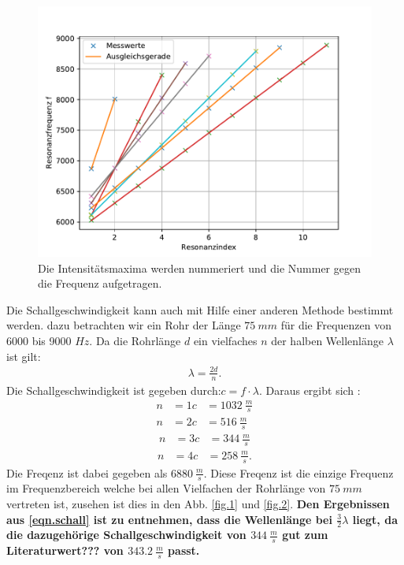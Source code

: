 \begin{figure}[h!]
  \centering
  \includegraphics[width=\textwidth]{linearfit.pdf}
  \caption{Die Intensitätsmaxima werden nummeriert und die Nummer gegen die Frequenz aufgetragen.}
  \label{fig.linearfit}
\end{figure}
\FloatBarrier
Die Schallgeschwindigkeit kann auch mit Hilfe einer anderen Methode bestimmt werden.
dazu betrachten wir ein Rohr der Länge $\SI{75}{mm}$ für die Frequenzen von 6000 bis 9000 $\si{Hz}$.
Da die Rohrlänge $d$ ein vielfaches $n$ der halben Wellenlänge $\lambda$ ist gilt:
\begin{align*}
  \lambda = \frac{2d}{n}.
\end{align*}
Die Schallgeschwindigkeit ist gegeben durch:$c=f \cdot \lambda$.
Daraus ergibt sich :
\begin{align*}
  n&=1  c&=\SI{1032}{\frac{m}{s}}\\
  n&=2  c&=\SI{516}{\frac{m}{s}}
\end{align*}
\begin{align}
  n&=3  c&=\SI{344}{\frac{m}{s}}
  \label{eqn.schall}
\end{align}
\begin{align*}
  n&=4  c&=\SI{258}{\frac{m}{s}}.
\end{align*}
Die Freqenz ist dabei gegeben als $\SI{6880}{\frac{m}{s}}$.
Diese Freqenz ist die einzige Frequenz im Frequenzbereich welche bei allen Vielfachen der Rohrlänge von $\SI{75}{mm}$ vertreten ist,
zusehen ist dies in den Abb. \ref{fig.1} und \ref{fig.2}.
\textbf{\huge{Den Ergebnissen aus \ref{eqn.schall} ist zu entnehmen, dass die Wellenlänge bei $\frac{3}{2}\lambda$ liegt, da die dazugehörige Schallgeschwindigkeit von $\SI{344}{\frac{m}{s}}$ gut zum Literaturwert??? von $\SI{343.2}{\frac{m}{s}}$ passt.}}

